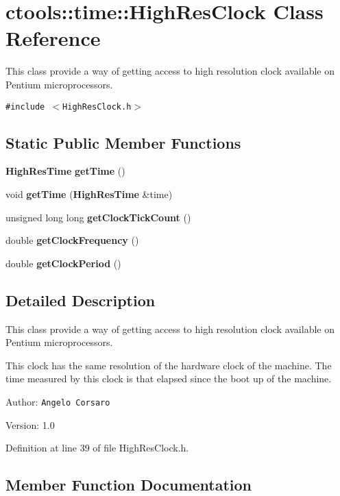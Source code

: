 \section{ctools::time::High\-Res\-Clock Class Reference}
\label{classctools_1_1time_1_1HighResClock}
This class provide a way of getting access to high resolution clock available on Pentium microprocessors.  


{\tt \#include $<$High\-Res\-Clock.h$>$}

\subsection*{Static Public Member Functions}
\begin{CompactItemize}
\item 
{\bf High\-Res\-Time} {\bf get\-Time} ()
\item 
void {\bf get\-Time} ({\bf High\-Res\-Time} \&time)
\item 
unsigned long long {\bf get\-Clock\-Tick\-Count} ()
\item 
double {\bf get\-Clock\-Frequency} ()
\item 
double {\bf get\-Clock\-Period} ()
\end{CompactItemize}


\subsection{Detailed Description}
This class provide a way of getting access to high resolution clock available on Pentium microprocessors. 

This clock has the same resolution of the hardware clock of the machine. The time measured by this clock is that elapsed since the boot up of the machine.

\begin{Desc}
\item[Author:]{\tt Angelo Corsaro} \end{Desc}
\begin{Desc}
\item[Version:]1.0 \end{Desc}




Definition at line 39 of file High\-Res\-Clock.h.

\subsection{Member Function Documentation}
